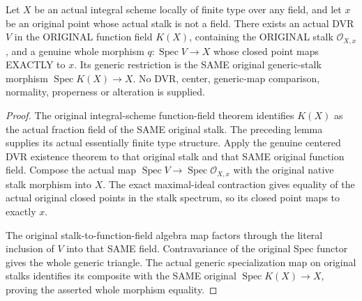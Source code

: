 \begin{theorem}
\label{alggeom:original-stalk-centered-dvr-morphism}
\leanok
{}
Let $X$ be an actual integral scheme locally of finite type over any field,
and let $x$ be an original point whose actual stalk is not a field.
There exists an actual DVR $V$ in the ORIGINAL function field $K(X)$,
containing the ORIGINAL stalk $\mathcal O_{X,x}$, and a genuine whole morphism
$q:\operatorname{Spec}V\to X$ whose closed point maps EXACTLY to $x$.
Its generic restriction is the SAME original generic-stalk morphism
$\operatorname{Spec}K(X)\to X$. No DVR, center, generic-map comparison,
normality, properness or alteration is supplied.
\end{theorem}
\begin{proof}
The original integral-scheme function-field theorem identifies $K(X)$ as the
actual fraction field of the SAME original stalk. The preceding lemma supplies
its actual essentially finite type structure. Apply the genuine centered DVR
existence theorem to that original stalk and that SAME original function field.
Compose the actual map $\operatorname{Spec}V\to\operatorname{Spec}\mathcal O_{X,x}$
with the original native stalk morphism into $X$. The exact maximal-ideal
contraction gives equality of the actual original closed points in the stalk
spectrum, so its closed point maps to exactly $x$.

The original stalk-to-function-field algebra map factors through the literal
inclusion of $V$ into that SAME field. Contravariance of the original Spec
functor gives the whole generic triangle. The actual generic specialization
map on original stalks identifies its composite with the SAME original
$\operatorname{Spec}K(X)\to X$, proving the asserted whole morphism equality.
\end{proof}
